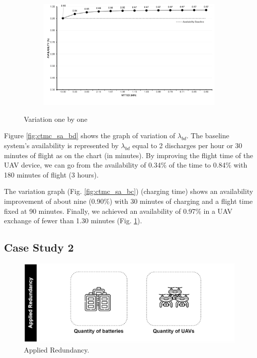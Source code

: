 \documentclass[conference]{IEEEtran}
\begin{document}
\begin{figure}[htbp]
\begin{subfigure}[b]{0.45\textwidth}
         \centering
         \includegraphics[width=\linewidth]{img/exps/SA_002.png}
         \caption{}
         \label{fig:ctmc_sa_suav}
     \end{subfigure}
        \caption{Variation one by one}
        \label{fig:ctmc_sa}
\end{figure}


Figure \ref{fig:ctmc_sa_bd} shows the graph of variation of $\lambda_{bd}$. The baseline system's availability is represented by $\lambda_{bd}$ equal to 2 discharges per hour or 30 minutes of flight as on the chart (in minutes). By improving the flight time of the UAV device, we can go from the availability of 0.34\% of the time to 0.84\% with 180 minutes of flight (3 hours). 

The variation graph (Fig. \ref{fig:ctmc_sa_bc}) (charging time) shows an availability improvement of about nine (0.90\%) with 30 minutes of charging and a flight time fixed at 90 minutes. Finally, we achieved an availability of 0.97\% in a UAV exchange of fewer than 1.30 minutes (Fig. \ref{fig:ctmc_sa_suav}).



\subsection{Case Study 2}\label{sec:case_studies_sub02}

\begin{figure}[htbp]
\centerline{\includegraphics[scale=0.22]{img/operating_model_study_02.png}}
\caption{Applied Redundancy.}
\label{fig:case_study_02}
\end{figure}
\end{document}
